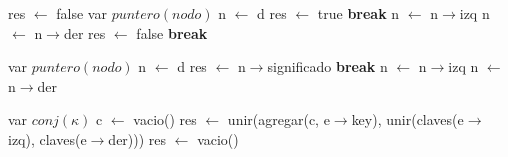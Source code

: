\begin{algorithm}\phantom{[H]}
\begin{algorithmic}[1]
    
     \State res $\gets$ false 
   \Else 
     \State var $puntero(nodo)$ n $\gets$ d 
      
          
            \State res $\gets$ true 
            \State \textbf{break} 
         \EndIf 
          
            \State n $\gets$ n$\rightarrow$izq 
         \Else
            \State n $\gets$ n$\rightarrow$der 
         \EndIf
           
            \State res $\gets$ false 
            \State \textbf{break}  
         \EndIf
      \EndWhile
   \EndIf
\EndFunction
\end{algorithmic}
\end{algorithm}



\begin{algorithm}\phantom{[H]}
\begin{algorithmic}[1]
   \State var $puntero(nodo)$ n $\gets$ d 
    
        
          \State res $\gets$ n$\rightarrow$significado 
          \State \textbf{break} 
       \EndIf
        
          \State n $\gets$ n$\rightarrow$izq 
       \Else
          \State n $\gets$ n$\rightarrow$der 
       \EndIf
    \EndWhile
 \EndIf
\EndFunction
\end{algorithmic}
\end{algorithm}

\begin{algorithm}\phantom{[H]}
\begin{algorithmic}[1]
 
  \State var $conj(\kappa)$ c $\gets$ vacio() 
    \State res $\gets$ unir(agregar(c, e$\rightarrow$key), unir(claves(e$\rightarrow$izq), claves(e$\rightarrow$der)))
  \Else
    \State res $\gets$ vacio() 
  \EndIf
\EndFunction
\end{algorithmic}
\end{algorithm}